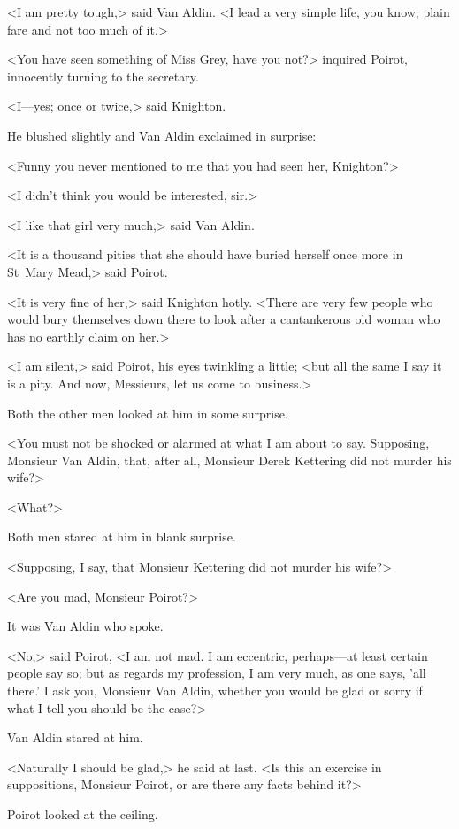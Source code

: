 <I am pretty tough,> said Van Aldin. <I lead a very simple life, you know; plain fare and not too much of it.>

<You have seen something of Miss Grey, have you not?> inquired Poirot, innocently turning to the secretary.

<I—yes; once or twice,> said Knighton.

He blushed slightly and Van Aldin exclaimed in surprise:

<Funny you never mentioned to me that you had seen her, Knighton?>

<I didn't think you would be interested, sir.>

<I like that girl very much,> said Van Aldin.

<It is a thousand pities that she should have buried herself once more in St~Mary Mead,> said Poirot.

<It is very fine of her,> said Knighton hotly. <There are very few people who would bury themselves down there to look after a cantankerous old woman who has no earthly claim on her.>

<I am silent,> said Poirot, his eyes twinkling a little; <but all the same I say it is a pity. And now, Messieurs, let us come to business.>

Both the other men looked at him in some surprise.

<You must not be shocked or alarmed at what I am about to say. Supposing, Monsieur Van Aldin, that, after all, Monsieur Derek Kettering did not murder his wife?>

<What?>

Both men stared at him in blank surprise.

<Supposing, I say, that Monsieur Kettering did not murder his wife?>

<Are you mad, Monsieur Poirot?>

It was Van Aldin who spoke.

<No,> said Poirot, <I am not mad. I am eccentric, perhaps—at least certain people say so; but as regards my profession, I am very much, as one says, 'all there.' I ask you, Monsieur Van Aldin, whether you would be glad or sorry if what I tell you should be the case?>

Van Aldin stared at him.

<Naturally I should be glad,> he said at last. <Is this an exercise in suppositions, Monsieur Poirot, or are there any facts behind it?>

Poirot looked at the ceiling.

